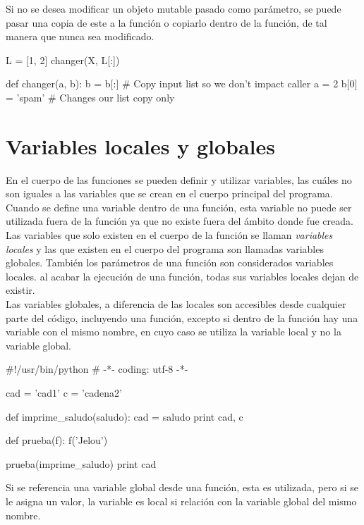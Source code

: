 Si no se desea modificar un objeto mutable pasado como parámetro, se puede pasar una copia de este a la función o copiarlo dentro de la función, de tal manera que nunca sea modificado.\\

\begin{pyglist} [language=python]
L = [1, 2]
changer(X, L[:])

def changer(a, b):
    b = b[:]        # Copy input list so we don't impact caller
    a = 2
    b[0] = 'spam'   # Changes our list copy only
\end{pyglist}


\section{Variables locales y globales}

En el cuerpo de las funciones se pueden definir y utilizar variables, las cuáles no son iguales a las variables que se crean en el cuerpo principal del programa. Cuando se define una variable dentro de una función, esta variable no puede ser utilizada fuera de la función ya que no existe fuera del ámbito donde fue creada.\\

Las variables que solo existen en el cuerpo de la función se llaman \textit{variables locales} y las que existen en el cuerpo del programa son llamadas variables globales. También los parámetros de una función son considerados variables locales. al acabar la ejecución de una función, todas sus variables locales dejan de existir.\\

Las variables globales, a diferencia de las locales son accesibles desde cualquier parte del código, incluyendo una función, excepto si dentro de la función hay una variable con el mismo nombre, en cuyo caso se utiliza la variable local y no la variable global.

\begin{pyglist} [language=python]
#!/usr/bin/python
# -*- coding: utf-8 -*-

cad = 'cad1'
c = 'cadena2'

def imprime_saludo(saludo):
    cad = saludo
    print cad, c

def prueba(f):
    f('Jelou')

prueba(imprime_saludo)
print cad
\end{pyglist}

Si se referencia una variable global desde una función, esta es utilizada, pero si se le asigna un valor, la variable es local si relación con la variable global del mismo nombre.

